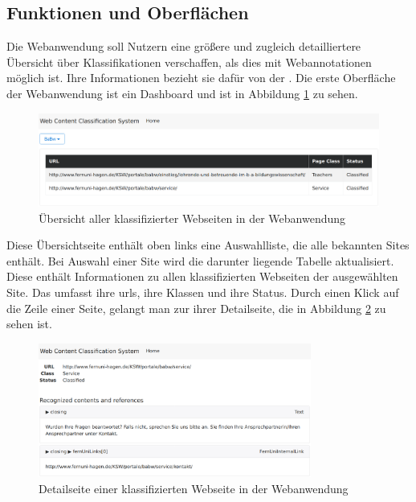 \subsection{Funktionen und Oberflächen}
    \label{section:solutionDetailsWebAppFunctions}
    Die Webanwendung soll Nutzern eine größere und zugleich detailliertere
    Übersicht über Klassifikationen verschaffen,
    als dies mit Webannotationen möglich ist.
    Ihre Informationen bezieht sie dafür von der
    {\classificationStorageAPI}.
    Die erste Oberfläche der Webanwendung ist ein Dashboard
    und ist in Abbildung \ref{image:webAppDashboard} zu sehen.

    \begin{figure}[htb]
        \centering
        \includegraphics[width=\textwidth]{../resources/web-app/dashboard.png}
        \caption{Übersicht aller klassifizierter Webseiten in der Webanwendung}
        \label{image:webAppDashboard}
    \end{figure}

    Diese Übersichtseite enthält oben links eine Auswahlliste, die alle bekannten Sites enthält.
    Bei Auswahl einer Site wird die darunter liegende Tabelle aktualisiert.
    Diese enthält Informationen zu allen klassifizierten Webseiten der ausgewählten Site.
    Das umfasst ihre \glspl{url}, ihre Klassen und ihre Status.
    Durch einen Klick auf die Zeile einer Seite,
    gelangt man zur ihrer Detailseite,
    die in Abbildung \ref{image:webAppDetailPage} zu sehen ist.

    \begin{figure}[htb]
        \centering
        \includegraphics[width=0.8\textwidth]{../resources/web-app/detail-page.png}
        \caption{Detailseite einer klassifizierten Webseite in der Webanwendung}
        \label{image:webAppDetailPage}
    \end{figure}


